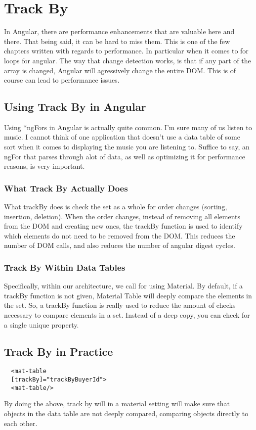 \chapter{ Track By }


In Angular, there are performance enhancements that are valuable here and there.
That being said, it can be hard to miss them. This is one of the few chapters
written with regards to performance. In particular when it comes to for loops
for angular. The way that change detection works, is that if any part of the
array is changed, Angular will agressively change the entire DOM. This is of
course can lead to performance issues.

\section{ Using Track By in Angular }
Using *ngFors in Angular is actually quite common. I'm sure many of us listen
to music. I cannot think of one application that doesn't use a data table of
some sort when it comes to displaying the music you are listening to. Suffice
to say, an ngFor that parses through alot of data, as well as optimizing it for
performance reasons, is very important.

\subsection{ What Track By Actually Does }

What trackBy does is check the set as a whole for order changes (sorting,
insertion, deletion). When the order changes, instead of removing all elements
from the DOM and creating new ones, the trackBy function is used to identify
which elements do not need to be removed from the DOM. This reduces the number
of DOM calls, and also reduces the number of angular digest cycles.


\subsection{ Track By Within Data Tables }
Specifically, within our architecture, we call for using Material. By default,
if a trackBy function is not given, Material Table will deeply compare the
elements in the set. So, a trackBy function is really used to reduce the amount
of checks necessary to compare elements in a set. Instead of a deep copy, you
can check for a single unique property.

\section{ Track By in Practice }
\begin{lstlisting}
  <mat-table
  [trackBy]="trackByBuyerId">
  <mat-table/>
\end{lstlisting}

By doing the above, track by will in a material setting will make sure that
objects in the data table are not deeply compared, comparing objects directly to
each other. 
